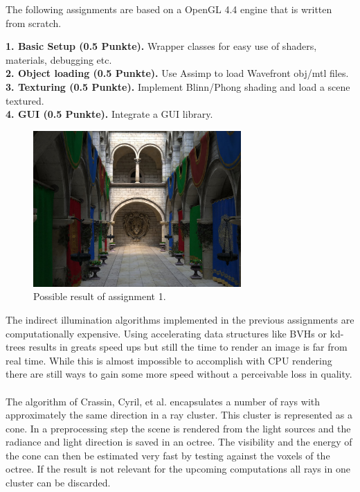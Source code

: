 \documentclass[A4paper]{gdv/gdv}
\newcommand{\teilaufgabe}[1]{\textbf{#1.}}
\begin{document}
\begin{gdvSheet}
  
\newcommand{\file}[1]{\texttt{#1}}
\newcommand{\code}[1]{\texttt{#1}}

The following assignments are based on a OpenGL 4.4 engine that is written from scratch. 

\teilaufgabe{1. Basic Setup (0.5 Punkte)} Wrapper classes for easy use of shaders, materials, debugging etc. \\
\teilaufgabe{2. Object loading (0.5 Punkte)} Use Assimp to load Wavefront obj/mtl files. \\
\teilaufgabe{3. Texturing (0.5 Punkte)} Implement Blinn/Phong shading and load a scene textured. \\
\teilaufgabe{4. GUI (0.5 Punkte)} Integrate a GUI library. \\

\begin{figure}[h]
\centering
\includegraphics[width=300px]{img/sponza.jpg}
\caption{Possible result of assignment 1.}
\end{figure}

The indirect illumination algorithms implemented in the previous assignments are computationally expensive. Using accelerating data structures like BVHs or kd-trees results in greats speed ups but still the time to render an image is far from real time. While this is almost impossible to accomplish with CPU rendering there are still ways to gain some more speed without a perceivable loss in quality. \\
\\
The algorithm of Crassin, Cyril, et al. encapsulates a number of rays with approximately the same direction in a ray cluster. This cluster is represented as a cone. In a preprocessing step the scene is rendered from the light sources and the radiance and light direction is saved in an octree. The visibility and the energy of the cone can then be estimated very fast by testing against the voxels of the octree. If the result is not relevant for the upcoming computations all rays in one cluster can be discarded.


\end{gdvSheet}
\end{document}
